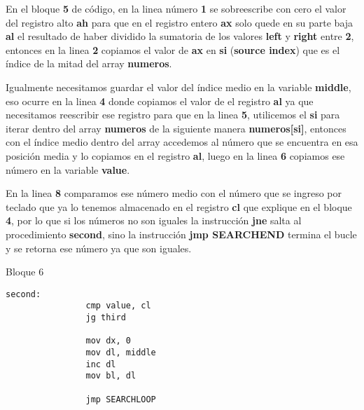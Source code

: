 \documentclass[a4paper,twoside]{article}
\newcommand{\codebordo}[1]{\textcolor{codebordo}{#1}}
\newcommand{\codeblue}[1]{\textcolor{codeblue}{#1}}
\begin{document}
    \vspace*{-1cm}
      \newpage
      {\Large En el bloque \textbf{5} de código, en la linea número \textbf{1} se sobreescribe con cero el valor del registro alto \codebordo{\textbf{ah}}
        para que en el registro entero \codebordo{\textbf{ax}} solo quede en su parte baja \codebordo{\textbf{al}} el resultado de haber 
        dividido la sumatoria de los valores \textbf{left} y \textbf{right} entre \textbf{2}, entonces en la linea \textbf{2} copiamos el valor
        de \codebordo{\textbf{ax}} en \codebordo{\textbf{si}} (\textbf{source index}) que es el índice de la mitad del array \textbf{numeros}.
      }

      {\Large Igualmente necesitamos guardar el valor del índice medio en la variable \textbf{middle}, eso ocurre en la linea \textbf{4}
        donde copiamos el valor de el registro \codebordo{\textbf{al}} ya que necesitamos reescribir ese registro para que en la linea \textbf{5}, 
        utilicemos el \codebordo{\textbf{si}} para iterar dentro del array \textbf{numeros} de la siguiente manera \textbf{numeros[\codebordo{\textbf{si}}]}, 
        entonces con el índice medio dentro del array accedemos al número que se encuentra en esa posición media y lo copiamos en el registro 
        \codebordo{\textbf{al}}, luego en la linea \textbf{6} copiamos ese número en la variable \textbf{value}.
      }
      
      {\Large En la linea \textbf{8} comparamos ese número medio con el número que se ingreso por teclado que ya lo tenemos almacenado en el registro 
      \codebordo{\textbf{cl}} que explique en el bloque \textbf{4}, por lo que si los números no son iguales la instrucción \codeblue{\textbf{jne}}
        salta al procedimiento \codeblue{\textbf{second}}, sino la instrucción \codeblue{\textbf{jmp SEARCHEND}} termina el bucle y se retorna ese 
        número ya que son iguales.
      }
      
      \vspace*{1cm}

    \begin{center}
      {\normalsize Bloque 6}
      \begin{lstlisting}[language=8086]
            second:
                cmp value, cl
                jg third
                
                mov dx, 0
                mov dl, middle
                inc dl
                mov bl, dl
                
                jmp SEARCHLOOP
      \end{lstlisting}
    \end{center} 
  \newpage
  \vspace*{-2cm}
  
\end{document}
